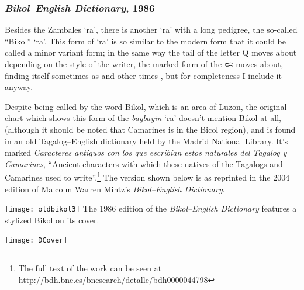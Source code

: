 \documentclass[a4paper,pagesize,openany,14pt,parskip=never]{scrbook}
\newcommand{\≈}{$\approx$}
\begin{document}
\subsubsection{{\em Bikol--English Dictionary}, 1986}
\label{BED}

Besides the Zambales `ra', there is another `ra' with a long pedigree, the so-called ``Bikol'' `ra'. This form of `ra' is so similar to the modern form that it could be called a minor variant form; in the same way the tail of the letter Q moves about depending on the style of the writer, the marked form of the {\baybayin ᜇ} moves about, finding itself sometimes as {\baybayinb {}} and other times {\baybayin {}}, but for completeness I include it anyway.

%    

Despite being called by the word Bikol, which is an area of Luzon, the original chart which shows this form of the {\em baybayin} `ra' doesn't mention Bikol at all, (although it should be noted that Camarines is in the Bicol region), and is found in an old Tagalog--English dictionary held by the Madrid National Library. It's marked {\em Caracteres antiguos con los que escribían estos naturales del Tagalog y Camarines}, ``Ancient characters with which these natives of the Tagalogs and Camarines used to write''.\footnote{The full text of the work can be seen at \url{http://bdh.bne.es/bnesearch/detalle/bdh0000044798}} The version shown below is as reprinted in the 2004 edition of Malcolm Warren Mintz's {\em Bikol--English Dictionary}.

\texttt{[image: oldbikol3]}
\newpage
The 1986 edition of the {\em Bikol--English Dictionary} features a stylized Bikol {\baybayinb {}} on its cover.

\texttt{[image: DCover]}
\newpage
\end{document}
